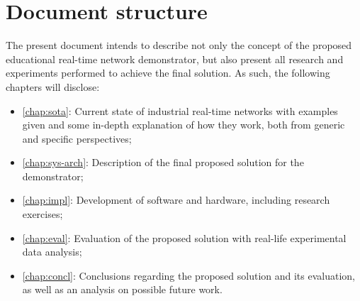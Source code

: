 \section{Document structure} \label{sec:doc-struct}

The present document intends to describe not only the concept of the proposed educational real-time network demonstrator, but also present all research and experiments performed to achieve the final solution. As such, the following chapters will disclose:

\begin{itemize}
	\item \autoref{chap:sota}: Current state of industrial real-time networks with examples given and some in-depth explanation of how they work, both from generic and specific perspectives;

	\item \autoref{chap:sys-arch}: Description of the final proposed solution for the demonstrator;

	\item \autoref{chap:impl}: Development of software and hardware, including research exercises;

	\item \autoref{chap:eval}: Evaluation of the proposed solution with real-life experimental data analysis;

	\item \autoref{chap:concl}: Conclusions regarding the proposed solution and its evaluation, as well as an analysis on possible future work.
\end{itemize}
